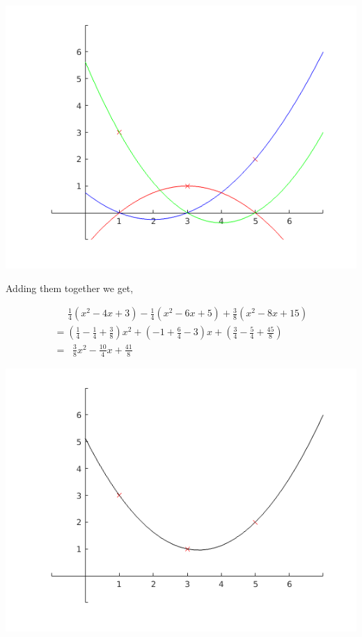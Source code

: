 \documentclass[MathsNotesBase.tex]{subfiles}
\begin{document}
\begin{center}
\includegraphics[width=\linewidth]{figure_3}
\end{center}


\begin{par}
\begin{flushleft}
Adding them together we get,
\end{flushleft}
\end{par}

\begin{par}
$$\begin{array}{lcr}
\;\;\;\;\; \frac{1}{4}(x^2-4x+3) - \frac{1}{4}(x^2-6x+5) + \frac{3}{8}(x^2-8x+15) \\[8pt]
= (\frac{1}{4}  - \frac{1}{4} + \frac{3}{8})x^2 + (-1 + \frac{6}{4} - 3)x + (\frac{3}{4} - \frac{5}{4} + \frac{45}{8}) \\[8pt]
= \;\; \frac{3}{8}x^2 - \frac{10}{4}x + \frac{41}{8} 
\end{array}$$
\end{par}


\begin{center}
\includegraphics[width=\linewidth]{figure_4}
\end{center}
\end{document}
